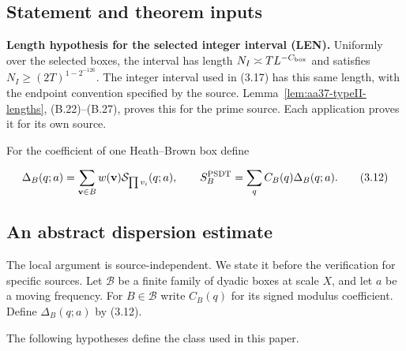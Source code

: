 \subsection{Statement and theorem inputs}

\textbf{Length hypothesis for the selected integer interval (LEN).}
Uniformly over the selected boxes, the interval has length
$N_I\asymp T L^{-C_{\rm box}}$ and satisfies
$N_I\ge(2T)^{1-2^{-126}}$.
The integer interval used in (3.17) has this same length, with the
endpoint convention specified by the source.
Lemma~\ref{lem:aa37-typeII-lengths}, (B.22)--(B.27), proves
this for the prime source.
Each application proves it for its own source.

For the coefficient of one Heath--Brown box define

\[
\Delta_B(q;a)=\sum_{\mathbf v\in B}w(\mathbf v)
                 \mathcal S_{\prod v_i}(q;a),\qquad
S_B^{\rm PSDT}=\sum_q C_B(q)\Delta_B(q;a).
\tag{3.12}
\]

\subsection{An abstract dispersion estimate}

The local argument is source-independent.
We state it before the verification for specific sources.
Let $\mathcal B$ be a finite
family of dyadic boxes at scale $X$, and let $a$ be a moving frequency.
For $B\in\mathcal B$ write $C_B(q)$ for its signed modulus coefficient.
Define $\Delta_B(q;a)$ by (3.12).

The following hypotheses define the class used in this paper.


